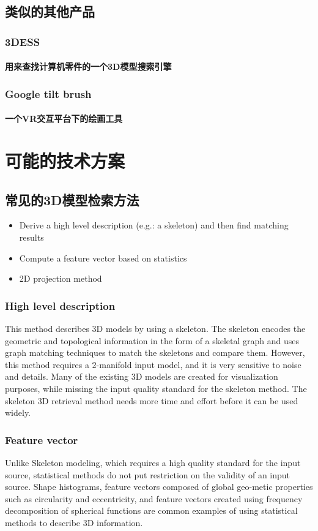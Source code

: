 \documentclass{article}
\begin{document}
\subsection{类似的其他产品}
\subsubsection{3DESS}
\paragraph{
用来查找计算机零件的一个3D模型搜索引擎
}
\subsubsection{Google tilt brush}
\paragraph{
一个VR交互平台下的绘画工具
}

\section{可能的技术方案}
\subsection{常见的3D模型检索方法}
\begin{itemize}
    \item Derive a high level description (e.g.: a skeleton) and then find matching results
    \item Compute a feature vector based on statistics
    \item 2D projection method
\end{itemize}
\subsubsection{High level description}
This method describes 3D models by using a skeleton. The skeleton encodes the geometric and topological information in the form of a skeletal graph and uses graph matching techniques to match the skeletons and compare them. However, this method requires a 2-manifold input model, and it is very sensitive to noise and details. Many of the existing 3D models are created for visualization purposes, while missing the input quality standard for the skeleton method. The skeleton 3D retrieval method needs more time and effort before it can be used widely.
\subsubsection{Feature vector}
Unlike Skeleton modeling, which requires a high quality standard for the input source, statistical methods do not put restriction on the validity of an input source. Shape histograms, feature vectors composed of global geo-metic properties such as circularity and eccentricity, and feature vectors created using frequency decomposition of spherical functions are common examples of using statistical methods to describe 3D information.
\end{document}
